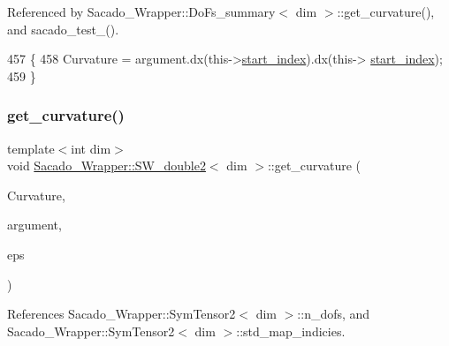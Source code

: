 Referenced by Sacado\+\_\+\+Wrapper\+::\+Do\+Fs\+\_\+summary$<$ dim $>$\+::get\+\_\+curvature(), and sacado\+\_\+test\+\_().


\begin{DoxyCode}
457     \{
458         Curvature = argument.dx(this->\hyperlink{classSacado__Wrapper_1_1SW__double2_ae7327540ad1fd725ea78ffc2268b423a}{start\_index}).dx(this->
      \hyperlink{classSacado__Wrapper_1_1SW__double2_ae7327540ad1fd725ea78ffc2268b423a}{start\_index});
459     \}
\end{DoxyCode}
\mbox{\label{classSacado__Wrapper_1_1SW__double2_a21da9eedb0c0e0d7db441426a5519a1a}} 
\subsubsection{\texorpdfstring{get\+\_\+curvature()}{get\_curvature()}\hspace{0.1cm}{\footnotesize\ttfamily [2/3]}}
{\footnotesize\ttfamily template$<$int dim$>$ \\
void \hyperlink{classSacado__Wrapper_1_1SW__double2}{Sacado\+\_\+\+Wrapper\+::\+S\+W\+\_\+double2}$<$ dim $>$\+::get\+\_\+curvature (\begin{DoxyParamCaption}\item[{Symmetric\+Tensor$<$ 2, dim $>$ \&}]{Curvature,  }\item[{Symmetric\+Tensor$<$ 2, dim, Sacado\+::\+Fad\+::\+D\+Fad$<$ \hyperlink{Sacado__Wrapper_8h_a7e0893207b87dad05c66a34baac8ed2e}{D\+Fad\+Type} $>$ $>$ \&}]{argument,  }\item[{\hyperlink{classSacado__Wrapper_1_1SymTensor2}{Sym\+Tensor2}$<$ dim $>$ \&}]{eps }\end{DoxyParamCaption})}



References Sacado\+\_\+\+Wrapper\+::\+Sym\+Tensor2$<$ dim $>$\+::n\+\_\+dofs, and Sacado\+\_\+\+Wrapper\+::\+Sym\+Tensor2$<$ dim $>$\+::std\+\_\+map\+\_\+indicies.


